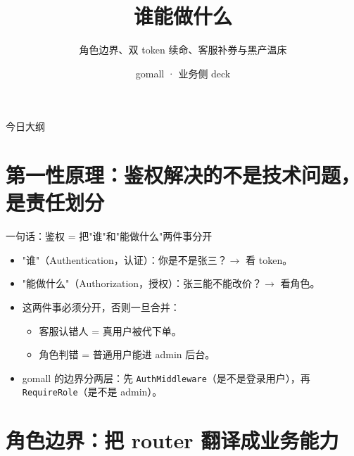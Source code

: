 

\title{谁能做什么}
\subtitle{角色边界、双 token 续命、客服补券与黑产温床}
\author{gomall · 业务侧 deck}
\date{}



\maketitle

\begin{frame}{今日大纲}
\tableofcontents
\end{frame}

\section{第一性原理：鉴权解决的不是技术问题，是责任划分}

\begin{frame}{一句话：鉴权 = 把"谁"和"能做什么"两件事分开}
\begin{itemize}
  \item "谁"（Authentication，认证）：你是不是张三？$\to$ 看 token。
  \item "能做什么"（Authorization，授权）：张三能不能改价？$\to$ 看角色。
  \item 这两件事必须分开，否则一旦合并：
  \begin{itemize}
    \item 客服认错人 = 真用户被代下单。
    \item 角色判错 = 普通用户能进 admin 后台。
  \end{itemize}
  \item gomall 的边界分两层：先 \texttt{AuthMiddleware}（是不是登录用户），再 \texttt{RequireRole}（是不是 admin）。
\end{itemize}
\end{frame}

\section{角色边界：把 router 翻译成业务能力}

